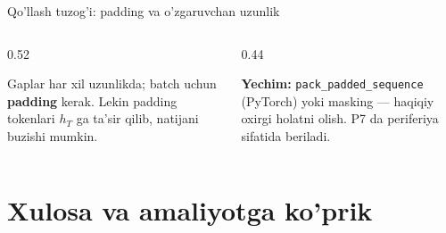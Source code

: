 \documentclass[aspectratio=169,11pt]{beamer}
\begin{document}
\begin{frame}{Qo'llash tuzog'i: padding va o'zgaruvchan uzunlik}
  \begin{columns}[T]
    \begin{column}{0.52\textwidth}
      \begin{tcolorbox}[warnbox,title=Batch da uzunlik har xil]
        \small
        Gaplar har xil uzunlikda; batch uchun \textbf{padding} kerak. Lekin
        padding tokenlari $h_T$ ga ta'sir qilib, natijani buzishi mumkin.
      \end{tcolorbox}
    \end{column}
    \begin{column}{0.44\textwidth}
      \begin{tcolorbox}[okbox,top=2pt,bottom=2pt]
        \footnotesize
        \textbf{Yechim:} \texttt{pack\_padded\_sequence} (PyTorch) yoki masking ---
        haqiqiy oxirgi holatni olish. P7 da periferiya sifatida beriladi.
      \end{tcolorbox}
    \end{column}
  \end{columns}
\end{frame}

\section[Xulosa]{Xulosa va amaliyotga ko'prik}
\end{document}
